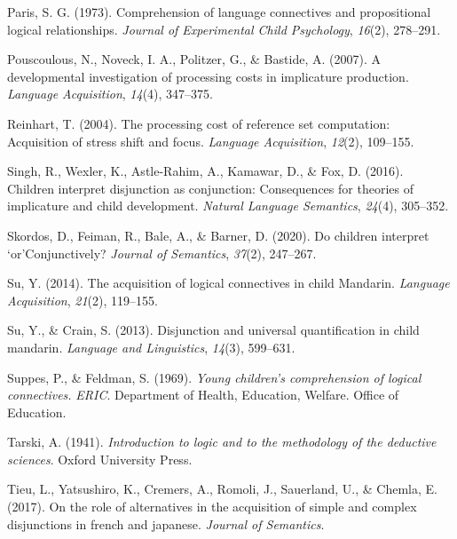 \documentclass[
  english,
  ,man,floatsintext]{apa6}
\begin{document}
\leavevmode\hypertarget{ref-paris1973comprehension}{}%
Paris, S. G. (1973). Comprehension of language connectives and propositional logical relationships. \emph{Journal of Experimental Child Psychology}, \emph{16}(2), 278--291.

\leavevmode\hypertarget{ref-pouscoulous2007developmental}{}%
Pouscoulous, N., Noveck, I. A., Politzer, G., \& Bastide, A. (2007). A developmental investigation of processing costs in implicature production. \emph{Language Acquisition}, \emph{14}(4), 347--375.

\leavevmode\hypertarget{ref-reinhart2004processing}{}%
Reinhart, T. (2004). The processing cost of reference set computation: Acquisition of stress shift and focus. \emph{Language Acquisition}, \emph{12}(2), 109--155.

\leavevmode\hypertarget{ref-Singh2016}{}%
Singh, R., Wexler, K., Astle-Rahim, A., Kamawar, D., \& Fox, D. (2016). Children interpret disjunction as conjunction: Consequences for theories of implicature and child development. \emph{Natural Language Semantics}, \emph{24}(4), 305--352.

\leavevmode\hypertarget{ref-skordos2020children}{}%
Skordos, D., Feiman, R., Bale, A., \& Barner, D. (2020). Do children interpret `or'Conjunctively? \emph{Journal of Semantics}, \emph{37}(2), 247--267.

\leavevmode\hypertarget{ref-su2014acquisition}{}%
Su, Y. (2014). The acquisition of logical connectives in child Mandarin. \emph{Language Acquisition}, \emph{21}(2), 119--155.

\leavevmode\hypertarget{ref-su2013disjunction}{}%
Su, Y., \& Crain, S. (2013). Disjunction and universal quantification in child mandarin. \emph{Language and Linguistics}, \emph{14}(3), 599--631.

\leavevmode\hypertarget{ref-suppes1969young}{}%
Suppes, P., \& Feldman, S. (1969). \emph{Young children's comprehension of logical connectives.} \emph{ERIC}. Department of Health, Education, Welfare. Office of Education.

\leavevmode\hypertarget{ref-tarski1941logic}{}%
Tarski, A. (1941). \emph{Introduction to logic and to the methodology of the deductive sciences}. Oxford University Press.

\leavevmode\hypertarget{ref-tieu2017}{}%
Tieu, L., Yatsushiro, K., Cremers, A., Romoli, J., Sauerland, U., \& Chemla, E. (2017). On the role of alternatives in the acquisition of simple and complex disjunctions in french and japanese. \emph{Journal of Semantics}.
\end{document}

